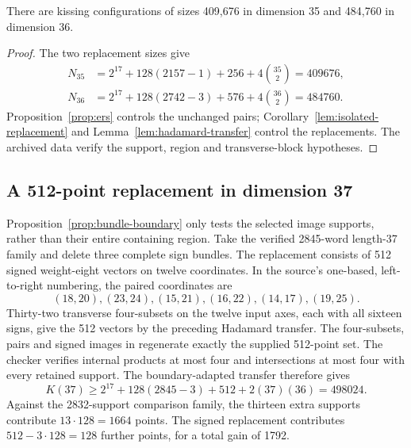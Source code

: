 \begin{theorem}
There are kissing configurations of sizes 409,676 in dimension 35 and
484,760 in dimension 36.
\end{theorem}
\begin{proof}
The two replacement sizes give
\begin{align*}
N_{35}&=2^{17}+128(2157-1)+256+4\binom{35}{2}=409676,\\
N_{36}&=2^{17}+128(2742-3)+576+4\binom{36}{2}=484760.
\end{align*}
Proposition~\ref{prop:ers} controls the unchanged pairs;
Corollary~\ref{lem:isolated-replacement} and
Lemma~\ref{lem:hadamard-transfer} control the replacements.
The archived data verify the support, region and transverse-block hypotheses.
\end{proof}


\subsection{A 512-point replacement in dimension 37}
Proposition~\ref{prop:bundle-boundary} only tests the selected image
supports, rather than their entire containing region. Take the verified
2845-word length-37 family and delete three complete sign bundles.
The replacement consists of 512 signed weight-eight vectors on twelve
coordinates. In the source's one-based, left-to-right numbering, the
paired coordinates are
\[
(18,20),(23,24),(15,21),(16,22),(14,17),(19,25).
\]
Thirty-two transverse four-subsets on the twelve input axes, each with all
sixteen signs, give the 512 vectors by the preceding Hadamard transfer.
The four-subsets, pairs and signed images in
 regenerate exactly
the supplied 512-point set. The checker verifies internal products at
most four and intersections at most four with every retained support.
The boundary-adapted transfer therefore gives
\[
K(37)\ge2^{17}+128(2845-3)+512+2(37)(36)=498024.
\]
Against the 2832-support comparison family, the thirteen extra supports
contribute $13\cdot128=1664$ points. The signed replacement contributes
$512-3\cdot128=128$ further points, for a total gain of 1792.

